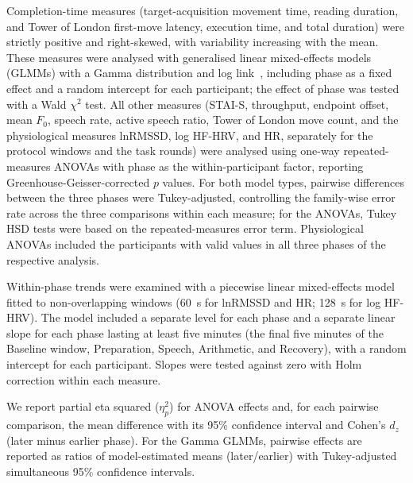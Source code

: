Completion-time measures (target-acquisition movement time, reading duration, and Tower of London first-move latency, execution time, and total duration) were strictly positive and right-skewed, with variability increasing with the mean. These measures were analysed with generalised linear mixed-effects models (GLMMs) with a Gamma distribution and log link~\citep{lo2015transform}, including phase as a fixed effect and a random intercept for each participant; the effect of phase was tested with a Wald $\chi^2$ test. All other measures (STAI-S, throughput, endpoint offset, mean $F_0$, speech rate, active speech ratio, Tower of London move count, and the physiological measures lnRMSSD, log HF-HRV, and HR, separately for the protocol windows and the task rounds) were analysed using one-way repeated-measures ANOVAs with phase as the within-participant factor, reporting Greenhouse-Geisser-corrected $p$ values. For both model types, pairwise differences between the three phases were Tukey-adjusted, controlling the family-wise error rate across the three comparisons within each measure; for the ANOVAs, Tukey HSD tests were based on the repeated-measures error term. Physiological ANOVAs included the participants with valid values in all three phases of the respective analysis.


Within-phase trends were examined with a piecewise linear mixed-effects model fitted to non-overlapping windows (60~s for lnRMSSD and HR; 128~s for log HF-HRV). The model included a separate level for each phase and a separate linear slope for each phase lasting at least five minutes (the final five minutes of the Baseline window, Preparation, Speech, Arithmetic, and Recovery), with a random intercept for each participant. Slopes were tested against zero with Holm correction within each measure.

We report partial eta squared ($\eta_p^2$) for ANOVA effects and, for each pairwise comparison, the mean difference with its 95\% confidence interval and Cohen's $d_z$ (later minus earlier phase). For the Gamma GLMMs, pairwise effects are reported as ratios of model-estimated means (later/earlier) with Tukey-adjusted simultaneous 95\% confidence intervals.

